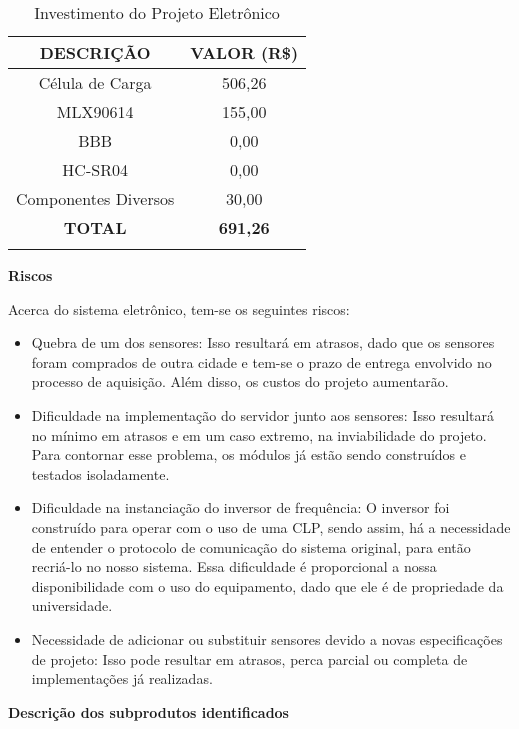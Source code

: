 	\begin{table}[!h]
	\centering
	\caption{Investimento do Projeto Eletrônico}
	\vspace{0.5cm}
	\begin{tabular}{ c c}
	\hline
	\textbf{DESCRIÇÃO}	&	\textbf{VALOR (R\$)}\\
	\hline
	Célula de Carga & 506,26 \\
	\hline
	MLX90614 & 155,00\\
	\hline
	BBB & 0,00\\
	\hline
	HC-SR04 & 0,00\\
	\hline
	Componentes Diversos & 30,00\\
	\hline
	\textbf{TOTAL} & \textbf{691,26}\\
	\hline

	\label{investimentoeletronica}
	\end{tabular}
	\end{table}

	\textbf{Riscos}

	Acerca do sistema eletrônico, tem-se os seguintes riscos:
	\begin{itemize}

	\item Quebra de um dos sensores: Isso resultará em atrasos, dado que os sensores foram comprados de outra cidade e tem-se o prazo de entrega envolvido no processo de aquisição. Além disso, os custos do projeto aumentarão.
	\item Dificuldade na implementação do servidor junto aos sensores: Isso resultará no mínimo em atrasos e em um caso extremo, na inviabilidade do projeto. Para contornar esse problema, os módulos já estão sendo construídos e testados isoladamente.
	\item Dificuldade na instanciação do inversor de frequência: O inversor foi construído para operar com o uso de uma CLP, sendo assim, há a necessidade de entender o protocolo de comunicação do sistema original, para então recriá-lo no nosso sistema. Essa dificuldade é proporcional a nossa disponibilidade com o uso do equipamento, dado que ele é de propriedade da universidade.
	\item Necessidade de adicionar ou substituir sensores devido a novas especificações de projeto: Isso pode resultar em atrasos, perca parcial ou completa de implementações já realizadas.

	\end{itemize}

	\textbf{Descrição dos subprodutos identificados}

